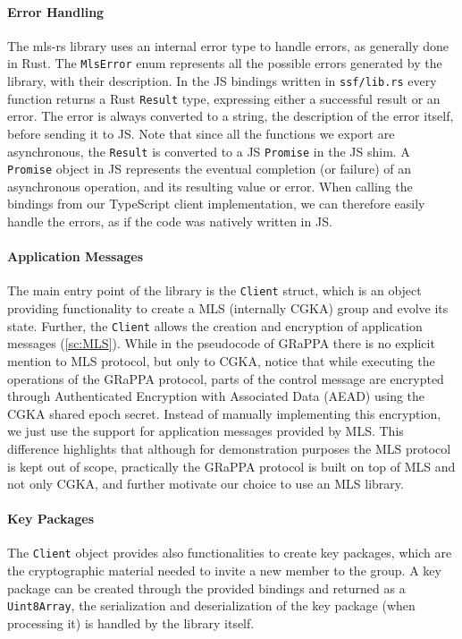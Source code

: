 \paragraph{Error Handling}
The mls-rs library uses an internal error type to handle errors, as generally
done in Rust. The \texttt{MlsError} enum represents all the possible errors generated
by the library, with their description.
In the JS bindings written in \texttt{ssf/lib.rs} every function returns a Rust
\texttt{Result} type, expressing either a successful result or an error.
The error is always converted to a string, the description of the error itself,
before sending it to JS. 
Note that since all the functions we export are asynchronous,
the \texttt{Result} is converted to a JS \texttt{Promise} in the JS shim.
A \texttt{Promise} object in JS represents the eventual completion (or failure) 
of an asynchronous operation, and its resulting value or error.
When calling the bindings from our TypeScript client implementation,
we can therefore easily handle the errors,
as if the code was natively written in JS.

\paragraph{Application Messages}
The main entry point of the library is the \texttt{Client} struct, which
is an object providing functionality to create a MLS (internally CGKA)
group and evolve its state. Further, the \texttt{Client} allows the creation
and encryption of application messages (\cref{sc:MLS}). While in the pseudocode 
of GRaPPA there is no explicit mention to MLS protocol, but only to CGKA,
notice that while executing the operations of the GRaPPA protocol,
parts of the control message are encrypted through Authenticated Encryption
with Associated Data (AEAD) using the CGKA shared epoch secret.
Instead of manually implementing this encryption, we just use the
support for application messages provided by MLS. This difference highlights
that although for demonstration purposes the MLS protocol is kept out of scope,
practically the GRaPPA protocol is built on top of MLS and not only CGKA, 
and further motivate our choice to use an MLS library.

\paragraph{Key Packages}
The \texttt{Client} object provides also functionalities to create
key packages, which are the cryptographic material needed to invite
a new member to the group. A key package can be created through the provided
bindings and returned as a \texttt{Uint8Array}, the serialization and
deserialization of the key package (when processing it) is handled by the 
library itself. 


